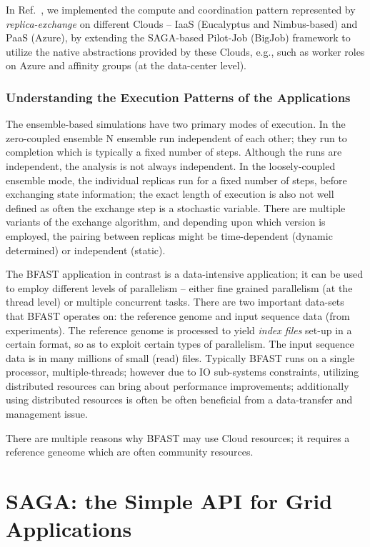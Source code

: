 \documentclass[10pt,conference,final,letterpaper,twoside,twocolumn,]{IEEEtran}
\newcommand{\I}[1]{\textit{#1}}
\begin{document}
 In Ref.~\cite{saga_bigjob_condor_cloud, bigjob_cloudcom10}, we
 implemented the compute and coordination pattern represented by
 \I{replica-exchange} on different Clouds -- IaaS (Eucalyptus and
 Nimbus-based) and PaaS (Azure), by extending the SAGA-based Pilot-Job
 (BigJob) framework to utilize the native abstractions provided by
 these Clouds, e.g., such as worker roles on Azure and affinity groups
 (at the data-center level).

\subsubsection*{Understanding the Execution Patterns of the
   Applications}

 The ensemble-based simulations have two primary modes of execution.
 In the zero-coupled ensemble N ensemble run independent of each
 other; they run to completion which is typically a fixed number of
 steps. Although the runs are independent, the analysis is not always
 independent. In the loosely-coupled ensemble mode, the individual
 replicas run for a fixed number of steps, before exchanging state
 information; the exact length of execution is also not well defined
 as often the exchange step is a stochastic variable.  There are
 multiple variants of the exchange algorithm, and depending upon which
 version is employed, the pairing between replicas might be
 time-dependent (dynamic determined) or independent (static).

 The BFAST application in contrast is a data-intensive application; it
 can be used to employ different levels of parallelism -- either fine
 grained parallelism (at the thread level) or multiple concurrent
 tasks.  There are two important data-sets that BFAST operates on: the
 reference genome and input sequence data (from experiments). The
 reference genome is processed to yield {\it index files} set-up in a
 certain format, so as to exploit certain types of parallelism. The
 input sequence data is in many millions of small (read) files.
 Typically BFAST runs on a single processor, multiple-threads; however
 due to IO sub-systems constraints, utilizing distributed resources
 can bring about performance improvements; additionally using
 distributed resources is often be often beneficial from a
 data-transfer and management issue.

 There are multiple reasons why BFAST may use Cloud resources; it
 requires a reference geneome which are often community resources.
 

\section{SAGA: the Simple API for Grid Applications}
\label{sec:saga}
\end{document}
